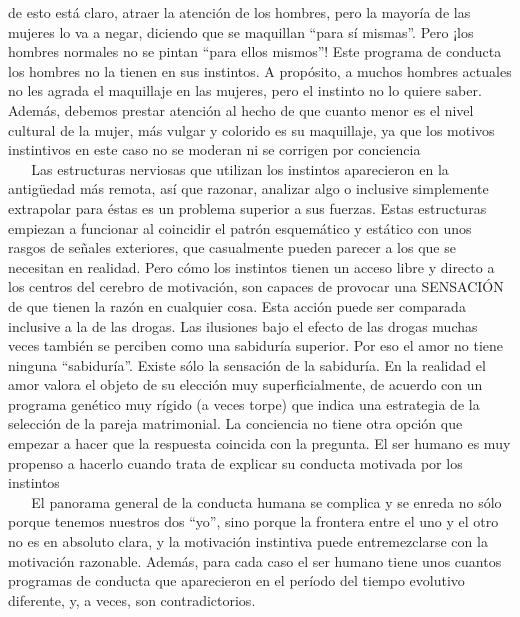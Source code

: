 de esto está claro, atraer la atención de los hombres, pero la mayoría
de las mujeres lo va a negar, diciendo que se maquillan ``para sí
mismas''. Pero ¡los hombres normales no se pintan ``para ellos mismos''!
Este programa de conducta los hombres no la tienen en sus instintos. A
propósito, a muchos hombres actuales no les agrada el maquillaje en las
mujeres, pero el instinto no lo quiere saber. Además, debemos prestar
atención al hecho de que cuanto menor es el nivel cultural de la mujer,
más vulgar y colorido es su maquillaje, ya que los motivos instintivos
en este caso no se moderan ni se corrigen por conciencia\\
\hspace*{0.333em} ~ ~ Las estructuras nerviosas que utilizan los
instintos aparecieron en la antigüedad más remota, así que razonar,
analizar algo o inclusive simplemente extrapolar para éstas es un
problema superior a sus fuerzas. Estas estructuras empiezan a funcionar
al coincidir el patrón esquemático y estático con unos rasgos de señales
exteriores, que casualmente pueden parecer a los que se necesitan en
realidad. Pero cómo los instintos tienen un acceso libre y directo a los
centros del cerebro de motivación, son capaces de provocar una SENSACIÓN
de que tienen la razón en cualquier cosa. Esta acción puede ser
comparada inclusive a la de las drogas. Las ilusiones bajo el efecto de
las drogas muchas veces también se perciben como una sabiduría superior.
Por eso el amor no tiene ninguna ``sabiduría''. Existe sólo la sensación
de la sabiduría. En la realidad el amor valora el objeto de su elección
muy superficialmente, de acuerdo con un programa genético muy rígido (a
veces torpe) que indica una estrategia de la selección de la pareja
matrimonial. La conciencia no tiene otra opción que empezar a hacer que
la respuesta coincida con la pregunta. El ser humano es muy propenso a
hacerlo cuando trata de explicar su conducta motivada por los
instintos\\
\hspace*{0.333em} ~ ~ El panorama general de la conducta humana se
complica y se enreda no sólo porque tenemos nuestros dos ``yo'', sino
porque la frontera entre el uno y el otro no es en absoluto clara, y la
motivación instintiva puede entremezclarse con la motivación razonable.
Además, para cada caso el ser humano tiene unos cuantos programas de
conducta que aparecieron en el período del tiempo evolutivo diferente,
y, a veces, son contradictorios.

